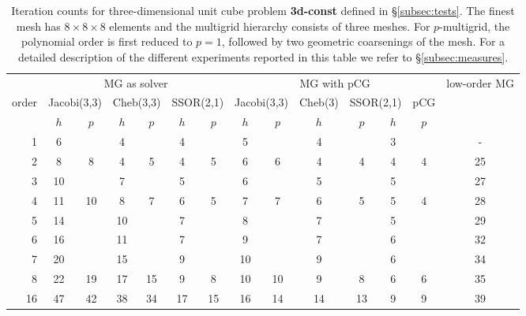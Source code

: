 \documentclass[times]{nlaauth}
\begin{document}
\begin{table}
  \caption{\label{tab:3d-box} Iteration counts for three-dimensional unit cube
    problem  {\bf 3d-const} defined in \S\ref{subsec:tests}.
    The finest
    mesh has $8\times 8\times 8$ elements and the multigrid hierarchy
    consists of three meshes.  For $p$-multigrid, the
    polynomial order is first reduced to $p=1$, followed by two
    geometric coarsenings of the mesh.
    For a
    detailed description of the different experiments reported in this
    table we refer to \S\ref{subsec:measures}.}  \centering
	  \begin{tabular}{|r|c c|c c|c c||c c|c c|c c||c|} 
	    \hline
	    & \multicolumn{6}{c||}{MG as solver} &
            \multicolumn{6}{c||}{MG with pCG} &
            \!\!low-order MG\!\! \\
	    \cline{2-13}
	    \!\!\! order \!\!\!\! &  \multicolumn{2}{c|}{\!\!\scriptsize  Jacobi(3,3)\!\!} &  \multicolumn{2}{c|}{\!\!\scriptsize Cheb(3,3)\!\!} & \multicolumn{2}{c||}{\!\!\scriptsize  SSOR(2,1)\!\!} & \multicolumn{2}{c|}{\!\!\scriptsize Jacobi(3,3)\!\!} &  \multicolumn{2,1}{c|}{\!\!\scriptsize Cheb(3)\!\!} & \multicolumn{2}{c||}{\!\!\scriptsize SSOR(2,1)\!\!} & pCG \\
	\hline
	 & $h$ & $p$ & $h$ & $p$& $h$ & $p$& $h$ & $p$& $h$ & $p$& $h$ & $p$& ~\\
	 \cline{2-13}
1 & 6 & & 4 & & 4 & & 5 & & 4 & & 3 & & -   \\
2 & 8 & 8 & 4 & 5 & 4 & 5 & 6 & 6 & 4 & 4 & 4 & 4 &  25  \\
3 & 10 & & 7 & & 5 & & 6 & & 5 & & 5 & & 27  \\
4 & 11 & 10 & 8 & 7 & 6 & 5 & 7 & 7 & 6 & 5 & 5 & 4 & 28 \\
5 & 14 & & 10 & & 7 & & 8 & & 7 & & 5 & & 29  \\
6 & 16 & & 11 & & 7 & & 9 & & 7 & & 6 & & 32  \\
7 & 20 & & 15 & & 9 & & 10 & & 9 & & 6 & & 34 \\
8 & 22 & 19 & 17 & 15 & 9 & 8 & 10 & 10 & 9 & 8 & 6 & 6 & 35 \\
16 & 47 & 42 & 38 & 34 & 17 & 15 & 16 & 14 & 14 & 13 & 9 & 9 & 39 \\
\hline 
 \end{tabular}
\end{table}
\end{document}
